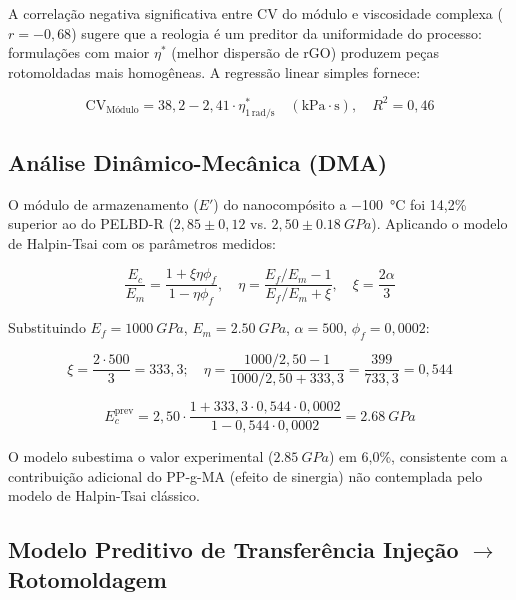 \documentclass[12pt,a4paper,twoside]{article}
\begin{document}
A correlação negativa significativa entre CV do módulo e viscosidade complexa ($r = -0,68$) sugere que a reologia é um preditor da uniformidade do processo: formulações com maior $\eta^*$ (melhor dispersão de rGO) produzem peças rotomoldadas mais homogêneas. A regressão linear simples fornece:

\begin{equation}
\text{CV}_{\text{Módulo}} = 38,2 - 2,41 \cdot \eta^*_{1\,\text{rad/s}} \quad (\text{kPa}\cdot\text{s}), \quad R^2 = 0,46
\label{eq:cv_viscosity}
\end{equation}

\subsection{Análise Dinâmico-Mecânica (DMA)}

O módulo de armazenamento ($E'$) do nanocompósito a \SI{-100}{\celsius} foi 14,2\% superior ao do PELBD-R ($2,85 \pm 0,12$ vs. $2,50 \pm \SI{0,18}{GPa}$). Aplicando o modelo de Halpin-Tsai \cite{Halpin1976} com os parâmetros medidos:

\begin{equation}
\frac{E_c}{E_m} = \frac{1 + \xi \eta \phi_f}{1 - \eta \phi_f}, \quad \eta = \frac{E_f/E_m - 1}{E_f/E_m + \xi}, \quad \xi = \frac{2\alpha}{3}
\label{eq:halpin_tsai}
\end{equation}

Substituindo $E_f = \SI{1000}{GPa}$, $E_m = \SI{2,50}{GPa}$, $\alpha = 500$, $\phi_f = 0,0002$:

\begin{equation}
\xi = \frac{2 \cdot 500}{3} = 333,3; \quad \eta = \frac{1000/2,50 - 1}{1000/2,50 + 333,3} = \frac{399}{733,3} = 0,544
\end{equation}

\begin{equation}
E_c^{\text{prev}} = 2,50 \cdot \frac{1 + 333,3 \cdot 0,544 \cdot 0,0002}{1 - 0,544 \cdot 0,0002} = \SI{2,68}{GPa}
\end{equation}

O modelo subestima o valor experimental ($\SI{2,85}{GPa}$) em 6,0\%, consistente com a contribuição adicional do PP-g-MA (efeito de sinergia) não contemplada pelo modelo de Halpin-Tsai clássico.

\subsection{Modelo Preditivo de Transferência Injeção $\rightarrow$ Rotomoldagem}
\end{document}
